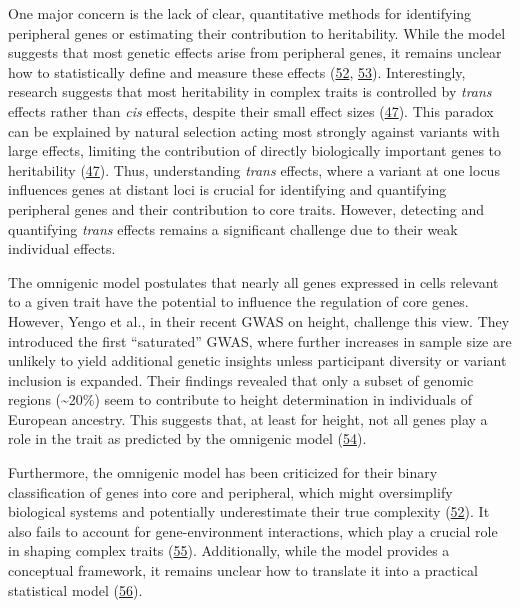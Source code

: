 One major concern is the lack of clear, quantitative methods for identifying peripheral genes or estimating their contribution to heritability.
While the model suggests that most genetic effects arise from peripheral genes, it remains unclear how to statistically define and measure these effects (\protect\hyperlink{ref-82fs3SZo}{52}, \protect\hyperlink{ref-javtAG7r}{53}).
Interestingly, research suggests that most heritability in complex traits is controlled by \emph{trans} effects rather than \emph{cis} effects, despite their small effect sizes (\protect\hyperlink{ref-LXvTZzEA}{47}).
This paradox can be explained by natural selection acting most strongly against variants with large effects, limiting the contribution of directly biologically important genes to heritability (\protect\hyperlink{ref-LXvTZzEA}{47}).
Thus, understanding \emph{trans} effects, where a variant at one locus influences genes at distant loci is crucial for identifying and quantifying peripheral genes and their contribution to core traits.
However, detecting and quantifying \emph{trans} effects remains a significant challenge due to their weak individual effects.

The omnigenic model postulates that nearly all genes expressed in cells relevant to a given trait have the potential to influence the regulation of core genes.
However, Yengo et al., in their recent GWAS on height, challenge this view.
They introduced the first ``saturated'' GWAS, where further increases in sample size are unlikely to yield additional genetic insights unless participant diversity or variant inclusion is expanded.
Their findings revealed that only a subset of genomic regions (\textasciitilde20\%) seem to contribute to height determination in individuals of European ancestry.
This suggests that, at least for height, not all genes play a role in the trait as predicted by the omnigenic model (\protect\hyperlink{ref-HFRaLwGQ}{54}).

Furthermore, the omnigenic model has been criticized for their binary classification of genes into core and peripheral, which might oversimplify biological systems and potentially underestimate their true complexity (\protect\hyperlink{ref-82fs3SZo}{52}).
It also fails to account for gene-environment interactions, which play a crucial role in shaping complex traits (\protect\hyperlink{ref-dg9nKuy0}{55}).
Additionally, while the model provides a conceptual framework, it remains unclear how to translate it into a practical statistical model (\protect\hyperlink{ref-1GlQtJ9Yz}{56}).

